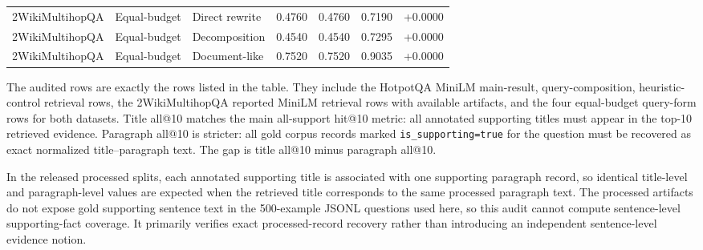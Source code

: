 \begin{table}[t]
\begin{threeparttable}
\begin{tabularx}{\textwidth}{>{\raggedright\arraybackslash}X l l r r r r}
2WikiMultihopQA & Equal-budget & Direct rewrite & 0.4760 & 0.4760 & 0.7190 & +0.0000 \\
2WikiMultihopQA & Equal-budget & Decomposition & 0.4540 & 0.4540 & 0.7295 & +0.0000 \\
2WikiMultihopQA & Equal-budget & Document-like & 0.7520 & 0.7520 & 0.9035 & +0.0000 \\
\bottomrule
\end{tabularx}
\begin{tablenotes}
\footnotesize
\item The audited rows are exactly the rows listed in the table. They include the HotpotQA MiniLM main-result, query-composition, heuristic-control retrieval rows, the 2WikiMultihopQA reported MiniLM retrieval rows with available artifacts, and the four equal-budget query-form rows for both datasets. Title all@10 matches the main all-support hit@10 metric: all annotated supporting titles must appear in the top-10 retrieved evidence. Paragraph all@10 is stricter: all gold corpus records marked \texttt{is\_supporting=true} for the question must be recovered as exact normalized title--paragraph text. The gap is title all@10 minus paragraph all@10.
\item In the released processed splits, each annotated supporting title is associated with one supporting paragraph record, so identical title-level and paragraph-level values are expected when the retrieved title corresponds to the same processed paragraph text. The processed artifacts do not expose gold supporting sentence text in the 500-example JSONL questions used here, so this audit cannot compute sentence-level supporting-fact coverage. It primarily verifies exact processed-record recovery rather than introducing an independent sentence-level evidence notion.
\end{tablenotes}
\end{threeparttable}
\end{table}
